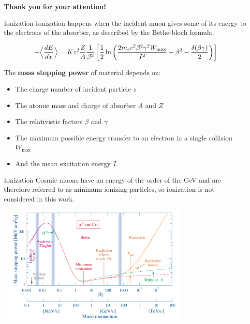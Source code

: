 \documentclass[8 pt]{beamer}
\newcommand{\backupbegin}{
   \newcounter{finalframe}
   \setcounter{finalframe}{\value{framenumber}}
}
\begin{document}
\begin{frame}{}
	\centering
	\huge{\textbf{\color{mycolor} Thank you  \color{black}}} \newline
	\LARGE{\textbf{\color{mycolor} for your attention! \color{black}}} \vfill
\end{frame}

\appendix
	\backupbegin
	
\begin{frame}{Ionization}
\justifying
Ionization happens when the  incident muon gives some of its energy to the electrons of the absorber, as described by the Bethe-bloch formula. \vfill

\begin{equation*}
\label{eq:BB}
- \Bigl \langle \frac{dE}{dx} \Bigr \rangle = K z^2 \frac{Z}{A} \frac{1}{\beta^2} \left [\frac{1}{2} \ln \left (\frac{2 m_e c^2 \beta^2 \gamma^2 W_{\text{max}}}{I^2} - \beta^2 - \frac{\delta(\beta \gamma)}{2} \right ) \right ]
\end{equation*} \vfill

The \textbf{mass stopping power} of material depends on:
\begin{itemize}
	\item The charge number of incident particle $z$
	\item The atomic mass and charge of absorber $A$ and $Z$
	\item The relativistic factors $\beta$ and $\gamma$
	\item The maximum possible energy transfer to an electron in a single collision $W_{\text{max}}$
	\item And the mean excitation energy $I$.
\end{itemize} \vfill
\end{frame}

\begin{frame}{Ionization}
\justifying
Cosmic muons have an energy of the order of the GeV and are therefore referred to as minimum ionizing particles, so ionization is not considered in this work.
\begin{center}
	\includegraphics[width=10cm, height=6cm]{figs/BB.png}
	\end{center}
\end{frame}
\end{document}
